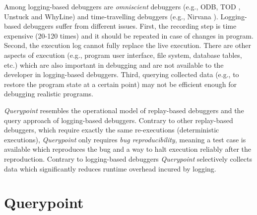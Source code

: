 \documentclass{sig-alternate}
\begin{document}
Among logging-based debuggers are \textit{omniscient} debuggers (e.g.,
ODB\cite{Lewis}, TOD \cite{Pothier}, Unstuck\cite{Hofer} and WhyLine\cite{Ko}) and
time-travelling debuggers (e.g., Nirvana \cite{Bhansali}). Logging-based debuggers 
suffer from different issues. First, the recording
step is time expensive (20-120 times) and it should be repeated in case of changes in
program. Second, the execution log cannot fully replace the live
execution. There are other aspects of execution (e.g., program user
interface, file system, database tables, etc.) which are also
important in debugging and are not available to the developer in 
logging-based debuggers. Third, querying collected data (e.g., to restore
the program state at a certain point) may not be efficient enough for
debugging realistic programs. 

\textit{Querypoint} resembles the operational model of replay-based debuggers
and the query approach of logging-based debuggers. Contrary to
other replay-based debuggers, which require exactly the same
re-executions (deterministic executions), \textit{Querypoint} only requires \textit{bug 
reproducibility}, meaning a test case is available which reproduces the bug and a 
way to halt execution reliably after the reproduction. Contrary to logging-based
debuggers \textit{Querypoint} selectively collects data which significantly reduces
runtime overhead incured by logging.




\section{Querypoint}
\label{sec:introExample}
\end{document}
